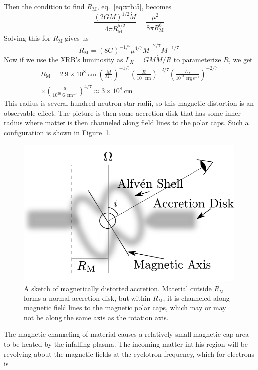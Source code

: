 \documentclass[10pt]{article}
\numberwithin{equation}{section}
\begin{document}
	Then the condition to find $R_{\mathrm{M}}$, eq.~\eqref{eq:xrb:5}, becomes
	\begin{equation}
		\label{eq:xrb:10} \frac{(2GM)^{1/2}\dot{M}}{4\pi R_{\mathrm{M}}^{5/2}} = \frac{\mu^2}{8\pi R_{\mathrm{M}}^6}
	\end{equation}
	Solving this for $R_{\mathrm{M}}$ gives us
	\begin{equation}
		\label{eq:xrb:11} R_{\mathrm{M}}=(8G)^{-1/7}\mu^{4/7}\dot{M}^{-2/7}M^{-1/7}
	\end{equation}
	Now if we use the XRB's luminosity as $L_X = GM\dot{M}/R$ to parameterize $R$, we get
	\begin{multline}
		\label{eq:xrb:12} R_{\mathrm{M}} = 2.9\times 10^8\ \mathrm{cm}\ \left(\frac{M}{M_\odot}\right)^{-1/7} \left(\frac{R}{10^6\ \mathrm{cm}}\right)^{-2/7}\left(\frac{L_X}{10^{37}\ \mathrm{erg\ s^{-1}}}\right)^{-2/7}\\
		\times \left(\frac{\mu}{10^{30}\ \mathrm{G\ cm^{-3}}}\right)^{4/7} \approx 3\times 10^8\ \mathrm{cm}
	\end{multline}
	This radius is several hundred neutron star radii, so this magnetic distortion is an observable effect. The picture is then some accretion disk that has some inner radius where matter is then channeled along field lines to the polar caps. Such a configuration is shown in Figure~\ref{fig:xrb:1}.
	\begin{figure}[ht]
		\centering
		\includegraphics[width = 0.6 \textwidth]{figures/alfven_shell.pdf}
		\caption{A sketch of magnetically distorted accretion. Material outside $R_{\mathrm{M}}$ forms a normal accretion disk, but within $R_{\mathrm{M}}$, it is channeled along magnetic field lines to the magnetic polar caps, which may or may not be along the same axis as the rotation axis.}
		\label{fig:xrb:1}
	\end{figure}
	The magnetic channeling of material causes a relatively small magnetic cap area to be heated by the infalling plasma. The incoming matter int his region will be revolving about the magnetic fields at the cyclotron frequency, which for electrons is 
\end{document}
